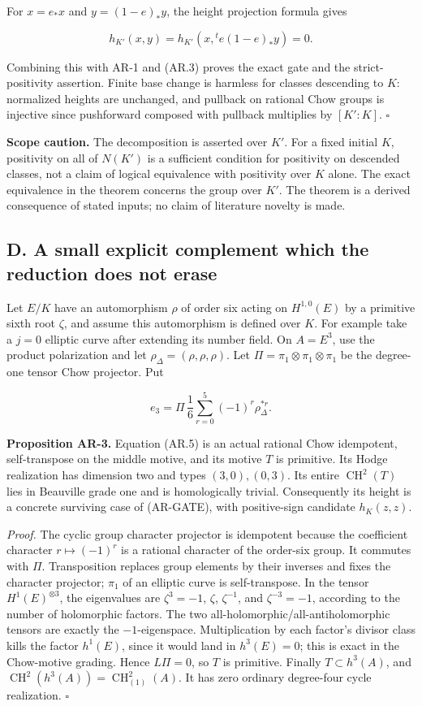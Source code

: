\documentclass[11pt,a4paper]{article}
\begin{document}
For \(x=e_*x\) and \(y=(1-e)_*y\), the height projection formula gives

\[
h_{K'}(x,y)=h_{K'}(x,{}^t e(1-e)_*y)=0.
\]

Combining this with AR-1 and (AR.3) proves the exact gate and the
strict-positivity assertion. Finite base change is harmless for classes
descending to \(K\): normalized heights are unchanged, and pullback on
rational Chow groups is injective since pushforward composed with
pullback multiplies by \([K':K]\). \(\square\)

\textbf{Scope caution.} The decomposition is asserted over \(K'\). For a
fixed initial \(K\), positivity on all of \(N(K')\) is a sufficient
condition for positivity on descended classes, not a claim of logical
equivalence with positivity over \(K\) alone. The exact equivalence in
the theorem concerns the group over \(K'\). The theorem is a derived
consequence of stated inputs; no claim of literature novelty is made.

\subsection{D. A small explicit complement which the reduction does not
erase}\label{d.-a-small-explicit-complement-which-the-reduction-does-not-erase}

Let \(E/K\) have an automorphism \(\rho\) of order six acting on
\(H^{1,0}(E)\) by a primitive sixth root \(\zeta\), and assume this
automorphism is defined over \(K\). For example take a \(j=0\) elliptic
curve after extending its number field. On \(A=E^3\), use the product
polarization and let \(\rho_\Delta=(\rho,\rho,\rho)\). Let
\(\Pi=\pi_1\otimes\pi_1\otimes\pi_1\) be the degree-one tensor Chow
projector. Put

\[
e_3=\Pi\,\frac16\sum_{r=0}^5(-1)^r\rho_\Delta^{*r}.
\tag{AR.5}
\]

\textbf{Proposition AR-3.} Equation (AR.5) is an actual rational Chow
idempotent, self-transpose on the middle motive, and its motive \(T\) is
primitive. Its Hodge realization has dimension two and types
\((3,0),(0,3)\). Its entire \(\operatorname{CH}^2(T)\) lies in Beauville
grade one and is homologically trivial. Consequently its height is a
concrete surviving case of (AR-GATE), with positive-sign candidate
\(h_K(z,z)\).

\emph{Proof.} The cyclic group character projector is idempotent because
the coefficient character \(r\mapsto(-1)^r\) is a rational character of
the order-six group. It commutes with \(\Pi\). Transposition replaces
group elements by their inverses and fixes the character projector;
\(\pi_1\) of an elliptic curve is self-transpose. In the tensor
\(H^1(E)^{\otimes3}\), the eigenvalues are \(\zeta^3=-1\), \(\zeta\),
\(\zeta^{-1}\), and \(\zeta^{-3}=-1\), according to the number of
holomorphic factors. The two all-holomorphic/all-antiholomorphic tensors
are exactly the \(-1\)-eigenspace. Multiplication by each factor's
divisor class kills the factor \(h^1(E)\), since it would land in
\(h^3(E)=0\); this is exact in the Chow-motive grading. Hence
\(L\Pi=0\), so \(T\) is primitive. Finally \(T\subset h^3(A)\), and
\(\operatorname{CH}^2(h^3(A))=\operatorname{CH}^2_{(1)}(A)\). It has
zero ordinary degree-four cycle realization. \(\square\)
\end{document}
